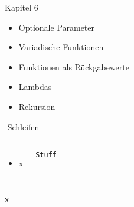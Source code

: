 
\begin{frame}[fragile]{Kapitel 6}
%
\begin{itemize}
\item Optionale Parameter
\item Variadische Funktionen
\item Funktionen als Rückgabewerte
\item Lambdas
\item Rekursion
\end{itemize}
%
\end{frame}


\begin{frame}[fragile]{-Schleifen}
%
\begin{columns}[T]
\begin{itemize}
\item x
\end{itemize}
%
\begin{codebox}
\begin{verbatim}
Stuff
\end{verbatim}
\end{codebox}
\end{columns}
%
\end{frame}


\begin{frame}[fragile]
%
\begin{codebox}
\begin{verbatim}
x
\end{verbatim}
\end{codebox}
%
\end{frame}

